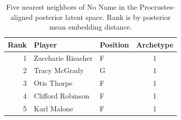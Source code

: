 \begin{table}[htbp]
  \centering\small
  \begin{tabular}{rllc}
    \toprule
    Rank & Player & Position & Archetype \\
    \midrule
    1 & Zaccharie Risacher & F & 1 \\
    2 & Tracy McGrady & G & 1 \\
    3 & Otis Thorpe & F & 1 \\
    4 & Clifford Robinson & F & 1 \\
    5 & Karl Malone & F & 1 \\
    \bottomrule
  \end{tabular}
  \caption{Five nearest neighbors of No Name in the Procrustes-aligned posterior latent space. Rank is by posterior mean embedding distance.}
  \label{tab:No_Name_neighbors}
\end{table}

